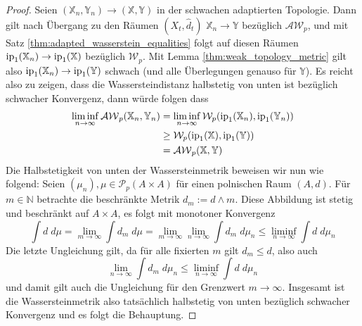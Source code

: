 \begin{proof}
    Seien $(\mathbb{X}_n, \mathbb{Y}_n) \rightarrow (\mathbb{X,Y})$ in der schwachen adaptierten Topologie. Dann gilt nach Übergang zu den Räumen $(X_t, \widehat{d}_t)$ $\mathbb{X}_n \rightarrow \mathbb{Y}$ bezüglich $\mathcal{AW}_p$, und mit Satz \ref{thm:adapted_wasserstein_equalities} folgt auf diesen Räumen $\operatorname{ip}_1(\mathbb{X}_n) \rightarrow \operatorname{ip}_1(\mathbb{X})$ bezüglich $\mathcal{W}_p$. Mit Lemma \ref{thm:weak_topology_metric} gilt also $\operatorname{ip}_1(\mathbb{X}_n) \rightarrow \operatorname{ip}_1(\mathbb{Y})$ schwach (und alle Überlegungen genauso für $\mathbb{Y}$). Es reicht also zu zeigen, dass die Wassersteindistanz halbstetig von unten ist bezüglich schwacher Konvergenz, dann würde folgen dass
    \begin{align*}
        \liminf_{n\rightarrow\infty} \mathcal{AW}_p(\mathbb{X}_n,\mathbb{Y}_n) &= \liminf_{n\rightarrow\infty} \mathcal{W}_p(\operatorname{ip}_1(\mathbb{X}_n), \operatorname{ip}_1(\mathbb{Y}_n)) \\
        &\geq \mathcal{W}_p(\operatorname{ip}_1(\mathbb{X}), \operatorname{ip}_1(\mathbb{Y})) \\
        &= \mathcal{AW}_p(\mathbb{X}, \mathbb{Y})
    \end{align*}
    Die Halbstetigkeit von unten der Wassersteinmetrik beweisen wir nun wie folgend: Seien $(\mu_n), \mu \in \mathcal{P}_p(A\times A)$ für einen polnischen Raum $(A, d)$. Für $m \in \mathbb{N}$ betrachte die beschränkte Metrik $d_m := d \wedge m$. Diese Abbildung ist stetig und beschränkt auf $A \times A$, es folgt mit monotoner Konvergenz
    $$\int d \;d\mu = \lim_{m\rightarrow \infty} \int d_m \;d\mu = \lim_{m\rightarrow\infty}\lim_{n\rightarrow\infty}\int d_m \;d\mu_n \leq \liminf_{n\rightarrow\infty} \int d \;d\mu_n$$
    Die letzte Ungleichung gilt, da für alle fixierten $m$ gilt $d_m\leq d$, also auch 
    $$\lim_{n\rightarrow\infty} \int d_m \; d\mu_n \leq \liminf_{n\rightarrow\infty} \int d \; d\mu_n$$
    und damit gilt auch die Ungleichung für den Grenzwert $m\rightarrow \infty$. Insgesamt ist die Wassersteinmetrik also tatsächlich halbstetig von unten bezüglich schwacher Konvergenz und es folgt die Behauptung.
\end{proof}